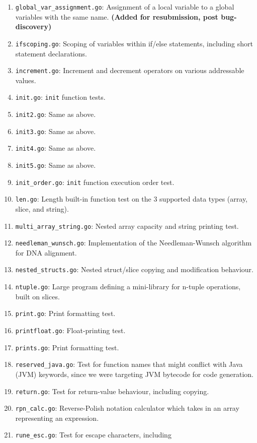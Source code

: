\documentclass[11pt]{article}
\begin{document}
\begin{enumerate}
  (fields). \textbf{(Added for resubmission, post bug-discovery)}
\item \texttt{global\_var\_assignment.go}: Assignment of a local
  variable to a global variables with the same name. \textbf{(Added
    for resubmission, post bug-discovery)}
\item \texttt{ifscoping.go}: Scoping of variables within if/else
  statements, including short statement declarations.
\item \texttt{increment.go}: Increment and decrement operators on
  various addressable values.
\item \texttt{init.go}: \texttt{init} function tests.
\item \texttt{init2.go}: Same as above.
\item \texttt{init3.go}: Same as above.
\item \texttt{init4.go}: Same as above.
\item \texttt{init5.go}: Same as above.
\item \texttt{init\_order.go}: \texttt{init} function execution order
  test.
\item \texttt{len.go}: Length built-in function test on the 3
  supported data types (array, slice, and string).
\item \texttt{multi\_array\_string.go}: Nested array capacity and
  string printing test.
\item \texttt{needleman\_wunsch.go}: Implementation of the
  Needleman-Wunsch algorithm for DNA alignment.
\item \texttt{nested\_structs.go}: Nested struct/slice copying and
  modification behaviour.
\item \texttt{ntuple.go}: Large program defining a mini-library for
  n-tuple operations, built on slices.
\item \texttt{print.go}: Print formatting test.
\item \texttt{printfloat.go}: Float-printing test.
\item \texttt{prints.go}: Print formatting test.
\item \texttt{reserved\_java.go}: Test for function names that might
  conflict with Java (JVM) keywords, since we were targeting JVM
  bytecode for code generation.
\item \texttt{return.go}: Test for return-value behaviour, including
  copying.
\item \texttt{rpn\_calc.go}: Reverse-Polish notation calculator which
  takes in an array representing an expression.
\item \texttt{rune\_esc.go}: Test for escape characters, including

\end{enumerate}
\end{document}
